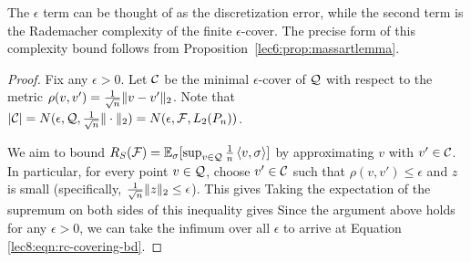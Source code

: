 The $\epsilon$ term can be thought of as the discretization error, while the second term is the Rademacher complexity of the finite $\epsilon$-cover. The precise form of this complexity bound follows from Proposition~\ref{lec6:prop:massartlemma}.

\begin{proof}
Fix any $\epsilon > 0$. Let $\mathcal C$ be the minimal $\epsilon$-cover of $\mathcal Q$ with respect to the metric $\rho(v,v') = \frac 1 {\sqrt{n}} \|v-v'\|_2$. Note that $\left\lvert\mathcal C\right\rvert = N(\epsilon, \mathcal Q, \frac{1}{\sqrt{n}} \|\cdot\|_2) = N(\epsilon, \mathcal F, L_2(P_n))$.

We aim to bound $R_S(\mathcal F) = \operatorname*{\mathbb{E}}_\sigma[\sup_{v \in \mathcal Q} \frac{1}{n} \left\langle v, \sigma\right\rangle]$ by approximating $v$ with $v' \in \mathcal C$. In particular, for every point $v \in \mathcal Q$, choose $v' \in \mathcal C$ such that $\rho(v, v') \leq \epsilon$ and $z$ is small (specifically, $\frac 1 {\sqrt{n}} \|z\|_2 \le \epsilon$). This gives
Taking the expectation of the supremum on both sides of this inequality gives
Since the argument above holds for any $\epsilon > 0$, we can take the infimum over all $\epsilon$ to arrive at Equation \eqref{lec8:eqn:rc-covering-bd}.

\end{proof}


